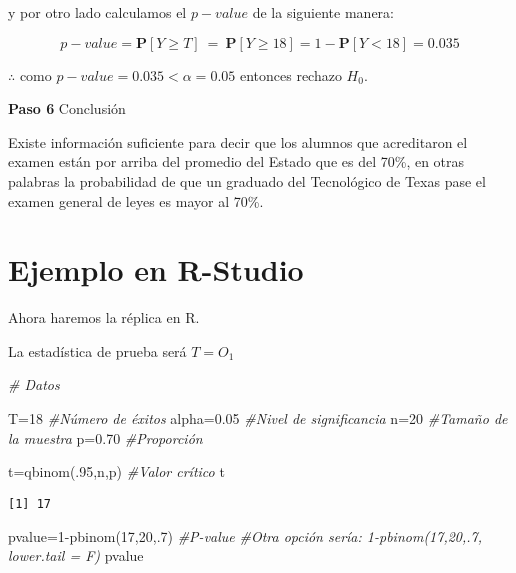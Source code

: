 \documentclass[
  a4paper,
  oneside,
  openany]{book}
\newenvironment{Shaded}{\begin{snugshade}}{\end{snugshade}}
\newcommand{\CommentTok}[1]{\textcolor[rgb]{0.56,0.35,0.01}{\textit{#1}}}
\newcommand{\DecValTok}[1]{\textcolor[rgb]{0.00,0.00,0.81}{#1}}
\newcommand{\FloatTok}[1]{\textcolor[rgb]{0.00,0.00,0.81}{#1}}
\newcommand{\FunctionTok}[1]{\textcolor[rgb]{0.00,0.00,0.00}{#1}}
\newcommand{\NormalTok}[1]{#1}
\newcommand{\OtherTok}[1]{\textcolor[rgb]{0.56,0.35,0.01}{#1}}
\newcommand{\SpecialCharTok}[1]{\textcolor[rgb]{0.00,0.00,0.00}{#1}}
\begin{document}
y por otro lado calculamos el \(p-value\) de la siguiente manera:

\[p-value= \mathbf{P}[Y \geq T] \  = \ \mathbf{P}[Y \geq 18]=1-\mathbf{P}[Y < 18]= 0.035\]

\(\therefore\) como \(p-value=0.035<\alpha=0.05\) entonces rechazo \(H_0\).

\textbf{Paso 6} Conclusión

Existe información suficiente para decir que los alumnos que acreditaron el examen están por arriba del promedio del Estado que es del 70\%, en otras palabras la probabilidad de que un graduado del Tecnológico de Texas pase el examen general de leyes es mayor al 70\%.

\hypertarget{ejemplo-en-r-studio}{%
\section{Ejemplo en R-Studio}\label{ejemplo-en-r-studio}}

Ahora haremos la réplica en R.

La estadística de prueba será \(T=O_1\)

\begin{Shaded}
\begin{Highlighting}[]
\CommentTok{\# Datos}

\NormalTok{T}\OtherTok{=}\DecValTok{18}                                   \CommentTok{\#Número de éxitos}
\NormalTok{alpha}\OtherTok{=}\FloatTok{0.05}                             \CommentTok{\#Nivel de significancia}
\NormalTok{n}\OtherTok{=}\DecValTok{20}                                   \CommentTok{\#Tamaño de la muestra}
\NormalTok{p}\OtherTok{=}\FloatTok{0.70}                                 \CommentTok{\#Proporción  }

\NormalTok{t}\OtherTok{=}\FunctionTok{qbinom}\NormalTok{(.}\DecValTok{95}\NormalTok{,n,p)                       }\CommentTok{\#Valor crítico}
\NormalTok{t}
\end{Highlighting}
\end{Shaded}

\begin{verbatim}
[1] 17
\end{verbatim}

\begin{Shaded}
\begin{Highlighting}[]
\NormalTok{pvalue}\OtherTok{=}\DecValTok{1}\SpecialCharTok{{-}}\FunctionTok{pbinom}\NormalTok{(}\DecValTok{17}\NormalTok{,}\DecValTok{20}\NormalTok{,.}\DecValTok{7}\NormalTok{)                 }\CommentTok{\#P{-}value}
\CommentTok{\#Otra opción sería: 1{-}pbinom(17,20,.7, lower.tail = F)}
\NormalTok{pvalue}
\end{Highlighting}
\end{Shaded}
\end{document}
